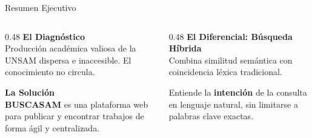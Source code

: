 \documentclass[11pt,aspectratio=169]{beamer}
\newcommand{\wordmark}{\textbf{\color{ink}BUSCA\color{brand}SAM}}
\begin{document}
\begin{frame}{Resumen Ejecutivo}
  \small
  \begin{columns}[T]
    \begin{column}{0.48\textwidth}
      {\headingfont\bfseries\color{brandlt}El Diagnóstico}\\[0.1cm]
      Producción académica valiosa de la UNSAM dispersa e inaccesible. El conocimiento no circula.

      \vspace{0.25cm}
      {\headingfont\bfseries\color{brandlt}La Solución}\\[0.1cm]
      \wordmark{} es una plataforma web para publicar y encontrar trabajos de forma ágil y centralizada.
    \end{column}

    \begin{column}{0.48\textwidth}
      {\headingfont\bfseries\color{brandlt}El Diferencial: Búsqueda Híbrida}\\[0.1cm]
      Combina similitud semántica con coincidencia léxica tradicional.

      \vspace{0.15cm}
      Entiende la \textbf{intención} de la consulta en lenguaje natural, sin limitarse a palabras clave exactas.
    \end{column}
  \end{columns}
\end{frame}
\end{document}
